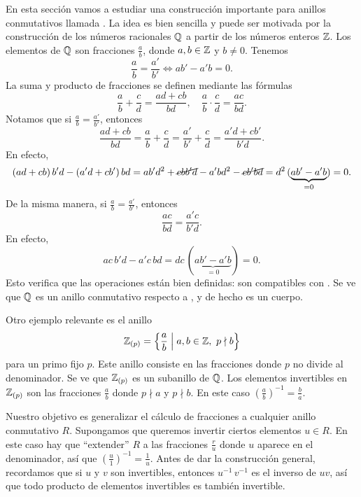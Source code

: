 En esta sección vamos a estudiar una construcción importante para anillos
conmutativos llamada . La idea es bien sencilla y puede ser
motivada por la construcción de los números racionales $\mathbb{Q}$ a partir de
los números enteros $\mathbb{Z}$. Los elementos de $\mathbb{Q}$ son fracciones $\frac{a}{b}$,
donde $a,b\in \mathbb{Z}$ y $b\ne 0$. Tenemos
\begin{equation}
  \label{eqn:igualdad-de-fracciones}
  \frac{a}{b} = \frac{a'}{b'} \iff ab' - a'b = 0.
\end{equation}
La suma y producto de fracciones se definen mediante las fórmulas
\begin{equation}
  \label{eqn:sumas-y-productos-de-fracciones}
  \frac{a}{b} + \frac{c}{d} = \frac{ad + cb}{bd}, \quad
  \frac{a}{b}\cdot\frac{c}{d} = \frac{ac}{bd}.
\end{equation}
Notamos que si $\frac{a}{b} = \frac{a'}{b'}$, entonces
\[ \frac{ad + cb}{bd} =
   \frac{a}{b} + \frac{c}{d} =
   \frac{a'}{b'} + \frac{c}{d} =
   \frac{a'd + cb'}{b'd}. \]
En efecto,
\[ (ad + cb)\,b'd - (a'd + cb')\,bd =
   ab'd^2 + \cancel{cbb'd} - a'bd^2 - \cancel{cb'bd} =
   d^2\,(\underbrace{ab' - a'b}_{= 0}) = 0. \]
De la misma manera, si $\frac{a}{b} = \frac{a'}{b'}$, entonces
$$\frac{ac}{bd} = \frac{a'c}{b'd}.$$
En efecto,
$$ac\,b'd - a'c\,bd = dc\,(\underbrace{ab' - a'b}_{= 0}) = 0.$$
Esto verifica que las operaciones 
están bien definidas: son compatibles con
. Se ve que $\mathbb{Q}$ es un anillo conmutativo
respecto a , y de hecho es
un cuerpo.

Otro ejemplo relevante es el anillo
$$\mathbb{Z}_{(p)} = \Bigl\{ \frac{a}{b} \Bigm| a,b\in \mathbb{Z}, ~ p\nmid b \Bigr\}$$
para un primo fijo $p$. Este anillo consiste en las fracciones donde $p$
no divide al denominador. Se ve que $\mathbb{Z}_{(p)}$ es un subanillo de $\mathbb{Q}$.
Los elementos invertibles en $\mathbb{Z}_{(p)}$ son las fracciones $\frac{a}{b}$ donde
$p \nmid a$ y $p \nmid b$. En este caso
$\left(\frac{a}{b}\right)^{-1} = \frac{b}{a}$.

Nuestro objetivo es generalizar el cálculo de fracciones a cualquier anillo
conmutativo $R$. Supongamos que queremos invertir ciertos elementos $u \in
R$. En este caso hay que ``extender'' $R$ a las fracciones $\frac{r}{u}$ donde
$u$ aparece en el denominador, así que
$\left(\frac{u}{1}\right)^{-1} = \frac{1}{u}$. Antes de dar la construcción
general, recordamos que si $u$ y $v$ son invertibles, entonces $u^{-1}\,v^{-1}$
es el inverso de $uv$, así que todo producto de elementos invertibles es también
invertible.

